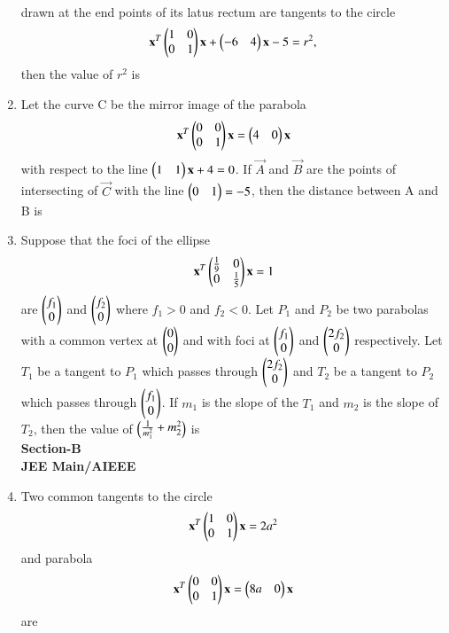 \documentclass[journal,12pt,twocolumn]{IEEEtran}
\begin{document}
\begin{enumerate}[label=\arabic*]
\begin{align}
    \end{align} drawn at the end points of its latus rectum are tangents to the circle
    \begin{align}
    \mathbf{x}^T\begin{pmatrix}1&0\\0&1\end{pmatrix}\mathbf{x}+\begin{pmatrix}-6&4\end{pmatrix}\mathbf{x}-5=r^2,
    \end{align} then the value of $r^2$ is 
    \item Let the curve C be the mirror image of the parabola
    \begin{align}
    \mathbf{x}^T\begin{pmatrix}0&0\\0&1\end{pmatrix}\mathbf{x}=\begin{pmatrix}4&0\end{pmatrix}\mathbf{x}
    \end{align} with respect to the line $\begin{pmatrix}1&1\end{pmatrix}\mathbf{x}+4=0$. If $\vec{A}$ and $\vec{B}$ are the points of intersecting of $\vec{C}$ with the line $\begin{pmatrix}0&1\end{pmatrix}=-5$, then the distance between  
    A and B is
    \item Suppose that the foci of the ellipse 
    \begin{align}
    \mathbf{x}^T\begin{pmatrix}\frac{1}{9}&0\\0&\frac{1}{5}\end{pmatrix}\mathbf{x}=1
    \end{align} are $\begin{pmatrix}f_1\\0\end{pmatrix}$ and $\begin{pmatrix}f_2\\0\end{pmatrix}$ where $f_1>0$ and $f_2<0$. Let $P_1$ and 			$P_2$ be two parabolas with a common vertex at $\begin{pmatrix}0\\0\end{pmatrix}$ and with foci at $\begin{pmatrix}f_1\\0\end{pmatrix}$ 		and $\begin{pmatrix}2f_2\\0\end{pmatrix}$ respectively. Let $T_1$ be a tangent to $P_1$ which passes through
    $\begin{pmatrix}2f_2\\0\end{pmatrix}$ and $T_2$ be a tangent to $P_2$ which passes through $\begin{pmatrix}f_1\\0\end{pmatrix}$. If
    $m_1$ is the slope of the $T_1$ and $m_2$ is the slope of $T_2$, then the value of 
    $\begin{pmatrix}\frac{1}{m_1^2}+m_2^2\end{pmatrix}$ is\\
    {\textbf{Section-B}}\\
    {\textbf{JEE Main/AIEEE}}
    \item Two common tangents to the circle
    \begin{align}
    \mathbf{x}^T\begin{pmatrix}1&0\\0&1\end{pmatrix}\mathbf{x}=2a^2
    \end{align} and parabola
    \begin{align}
    \mathbf{x}^T\begin{pmatrix}0&0\\0&1\end{pmatrix}\mathbf{x}=\begin{pmatrix}8a&0\end{pmatrix}\mathbf{x}
    \end{align} are

\end{enumerate}
\end{document}
